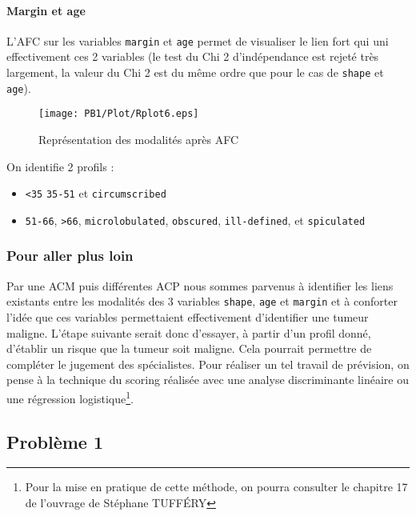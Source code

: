 \documentclass[a4paper]{report}
\begin{document}
     \subsubsection{Margin et age}
   L'AFC sur les variables \verb|margin| et \verb|age| permet de visualiser le lien fort qui uni effectivement ces 2 variables (le test du Chi 2 d'indépendance est rejeté très largement, la valeur du Chi 2 est du même ordre que pour le cas de \verb|shape| et \verb|age|). 

      \begin{figure}[!ht]
	\centering
     	\texttt{[image: PB1/Plot/Rplot6.eps]}

	\caption{Représentation des modalités après AFC}
\end{figure}

   On identifie 2 profils : 
   \begin{itemize}
      \item \verb|<35| \verb|35-51| et \verb|circumscribed|
   \item \verb|51-66|, \verb|>66|, \verb|microlobulated|, \verb|obscured|, \verb|ill-defined|, et \verb|spiculated|
   \end{itemize}
   
   
  \subsection{Pour aller plus loin}
  Par une ACM puis différentes ACP nous sommes parvenus à identifier les liens existants entre les modalités des 3 variables \verb|shape|, \verb|age| et \verb|margin| et à conforter l'idée que ces variables permettaient effectivement d'identifier une tumeur maligne. L'étape suivante serait donc d'essayer, à partir d'un profil donné, d'établir un risque que la tumeur soit maligne. Cela pourrait permettre de compléter le jugement des spécialistes. Pour réaliser un tel travail de prévision, on pense à la technique du scoring réalisée avec une analyse discriminante linéaire ou une régression logistique\footnote{Pour la mise en pratique de cette méthode, on pourra consulter le chapitre 17 de l'ouvrage de Stéphane TUFFÉRY}.    
  
  

 
 \begin{appendix}
 \chapter{Problème 1}
 \label{Pb1}

\end{appendix}
\end{document}
